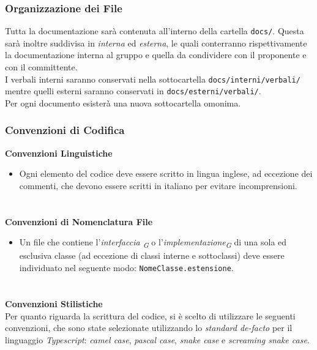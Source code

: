 \documentclass[a4paper, 12pt]{article}
\begin{document}
\subsubsection{Organizzazione dei File}
Tutta la documentazione sarà contenuta all'interno della cartella \texttt{docs/}. Questa sarà inoltre suddivisa in \textit{interna} ed \textit{esterna}, le quali conterranno rispettivamente la documentazione interna al gruppo e quella da condividere con il proponente e con il committente. \\
I verbali interni saranno conservati nella sottocartella \texttt{docs/interni/verbali/} mentre quelli esterni saranno conservati in \texttt{docs/esterni/verbali/}.\\
Per ogni documento esisterà una nuova sottocartella omonima.

\subsubsection{Convenzioni di Codifica}
\textbf{Convenzioni Linguistiche} \newline
\begin{itemize}
    \item Ogni elemento del codice deve essere scritto in lingua inglese, ad eccezione dei commenti, che devono essere scritti in italiano per evitare incomprensioni.
\end{itemize}
\paragraph{}\\
\textbf{Convenzioni di Nomenclatura File}
\begin{itemize}
    \item Un file che contiene l'\textit{interfaccia \textsubscript{G}} o l'\textit{implementazione\textsubscript{G}} di una sola ed esclusiva classe (ad eccezione di classi interne e sottoclassi) deve essere individuato nel seguente modo: \texttt{NomeClasse.estensione}.
\end{itemize}
\paragraph{} \\
\textbf{Convenzioni Stilistiche} \\
Per quanto riguarda la scrittura del codice, si è scelto di utilizzare le seguenti convenzioni, che sono state selezionate utilizzando lo \textit{standard de-facto} per il linguaggio \textit{Typescript}: \textit{camel case}, \textit{pascal case}, \textit{snake case} e \textit{screaming snake case}.\\ \\
\end{document}

